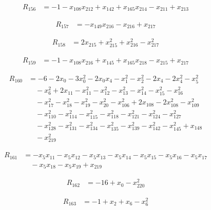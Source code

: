 \documentclass[11pt,letterpaper]{article}
\theoremstyle{definition}
\theoremstyle{remark}
\begin{document}
\begin{align*}
R_{156} &= -1 -x_{108} x_{212} +x_{142} +x_{165} x_{214} -x_{211} +x_{213}
\end{align*}

\begin{align*}
R_{157} &= -x_{149} x_{216} -x_{216} +x_{217}
\end{align*}

\begin{align*}
R_{158} &= 2 x_{215} +x_{215}^{2} +x_{216}^{2} -x_{217}^{2}
\end{align*}

\begin{align*}
R_{159} &= -1 -x_{108} x_{216} +x_{145} +x_{165} x_{218} -x_{215} +x_{217}
\end{align*}

\begin{align*}
R_{160} &= -6 -2 x_{0} -3 x_{0}^{2} -2 x_{0} x_{4} -x_{1}^{2} -x_{2}^{2} -2 x_{4} -2 x_{4}^{2} -x_{5}^{2} \\
&\quad -x_{6}^{2} +2 x_{11} -x_{11}^{2} -x_{12}^{2} -x_{13}^{2} -x_{14}^{2} -x_{15}^{2} -x_{16}^{2} \\
&\quad -x_{17}^{2} -x_{18}^{2} -x_{19}^{2} -x_{20}^{2} -x_{106}^{2} +2 x_{108} -2 x_{108}^{2} -x_{109}^{2} \\
&\quad -x_{110}^{2} -x_{114}^{2} -x_{115}^{2} -x_{118}^{2} -x_{121}^{2} -x_{124}^{2} -x_{127}^{2} \\
&\quad -x_{128}^{2} -x_{131}^{2} -x_{134}^{2} -x_{135}^{2} -x_{139}^{2} -x_{142}^{2} -x_{145}^{2} +x_{148} \\
&\quad -x_{219}^{2}
\end{align*}

\begin{align*}
R_{161} &= -x_{5} x_{11} -x_{5} x_{12} -x_{5} x_{13} -x_{5} x_{14} -x_{5} x_{15} -x_{5} x_{16} -x_{5} x_{17} \\
&\quad -x_{5} x_{18} -x_{5} x_{19} +x_{219}
\end{align*}

\begin{align*}
R_{162} &= -16 +x_{0} -x_{220}^{2}
\end{align*}

\begin{align*}
R_{163} &= -1 +x_{2} +x_{6} -x_{6}^{2}
\end{align*}
\end{document}
